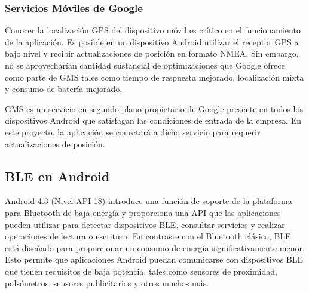 \subsubsection{Servicios Móviles de Google}
Conocer la localización \ac{GPS} del dispositivo móvil es crítico en el funcionamiento de la aplicación. Es posible en un dispositivo Android utilizar el receptor \ac{GPS} a bajo nivel y recibir actualizaciones de posición en formato NMEA. Sin embargo, no se aprovecharían cantidad sustancial de optimizaciones que Google ofrece como parte de \ac{GMS} tales como tiempo de respuesta mejorado, localización mixta y consumo de batería mejorado. 

\ac{GMS} es un servicio en segundo plano propietario de Google presente en todos los dispositivos Android que satisfagan las condiciones de entrada de la empresa. En este proyecto, la aplicación se conectará a dicho servicio para requerir actualizaciones de posición.

\subsection{BLE en Android}
 Android 4.3 (Nivel API 18) introduce una función de soporte de la plataforma para Bluetooth de baja energía y proporciona una API que las aplicaciones pueden utilizar para detectar dispositivos \ac{BLE}, consultar servicios y realizar operaciones de lectura o escritura. En contraste con el Bluetooth clásico, \ac{BLE} está diseñado para proporcionar un consumo de energía significativamente menor. Esto permite que aplicaciones Android puedan comunicarse con dispositivos BLE que tienen requisitos de baja potencia, tales como sensores de proximidad, pulsómetros, sensores publicitarios y otros muchos más.
 
